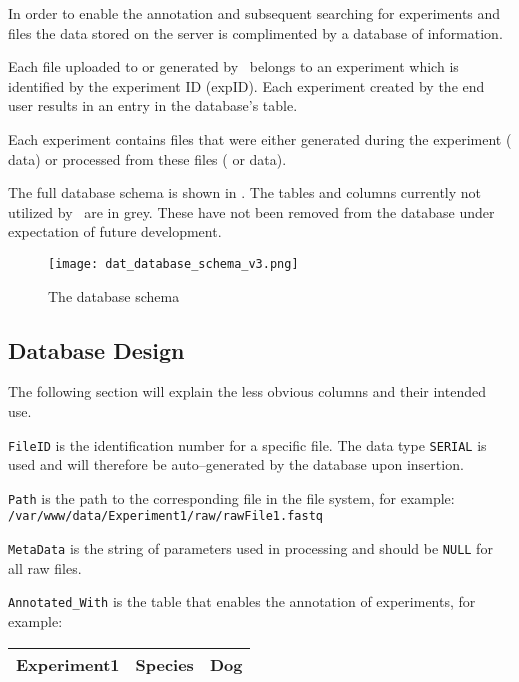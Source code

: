 In order to enable the annotation and subsequent searching for experiments and files the data stored on the server is complimented by a database of information.

Each file uploaded to or generated by \appName\ belongs to an experiment which is identified by the experiment ID (expID). Each experiment created by the end user results in an entry in the database's  table.

Each experiment contains files that were either generated during the experiment ( data) or processed from these files ( or  data).

The full database schema is shown in . The tables and columns currently not utilized by \appName\ are in grey. These have not been removed from the database under expectation of future development.

\begin{figure}[p]
\centering
\texttt{[image: dat\_database\_schema\_v3.png]}
\caption{The database schema}
\label{fig:dat_databaseSchema}
\end{figure}

\FloatBarrier

\subsection{Database Design}
The following section will explain the less obvious columns and their intended use.

\texttt{FileID} is the identification number for a specific file. The data type \texttt{SERIAL} is used and will therefore be auto--generated by the database upon insertion.

\texttt{Path} is the path to the corresponding file in the file system, for example:
\texttt{/var/www/data/Experiment1/raw/rawFile1.fastq}

\texttt{MetaData} is the string of parameters used in processing and should be \texttt{NULL} for all raw files.

\texttt{Annotated\_With} is the table that enables the annotation of experiments, for example:
\begin{center}
  \begin{tabular}{| l | l | l |}
    \hline
    Experiment1 & Species & Dog \\
    \hline
  \end{tabular}
\end{center}

